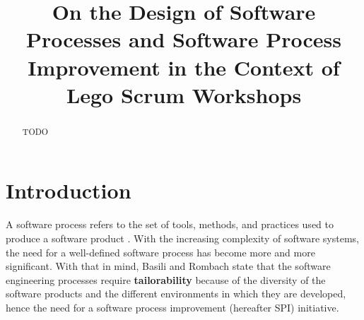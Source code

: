 \documentclass[conference]{IEEEtran}
\begin{document}
\title{On the Design of Software Processes and Software Process Improvement in
the Context of Lego Scrum Workshops}

\author{
}

\maketitle

\begin{abstract}

TODO
\end{abstract}

\section{Introduction}


A software process refers to the set of tools, methods, and practices used to
produce a software product \cite{Humphrey1989}.
With the increasing complexity of software systems, the need for a well-defined
software process has become more and more significant.
With that in mind, Basili and Rombach \cite{Basili1988} state that the software
engineering processes require \textbf{tailorability} because of the diversity
of the software products and the different environments in which they are
developed, hence the need for a software process improvement (hereafter SPI)
initiative.
\end{document}
